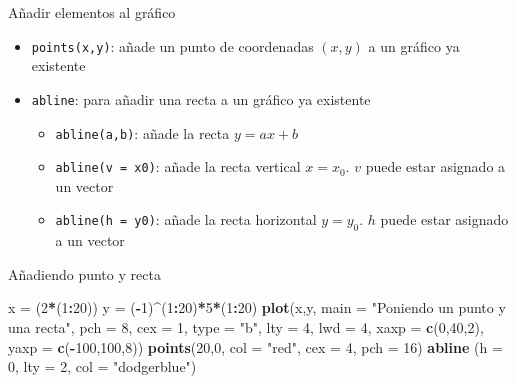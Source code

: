 \documentclass[
  ignorenonframetext,
]{beamer}
\newenvironment{Shaded}{\begin{snugshade}}{\end{snugshade}}
\newcommand{\AttributeTok}[1]{\textcolor[rgb]{0.13,0.29,0.53}{#1}}
\newcommand{\DecValTok}[1]{\textcolor[rgb]{0.00,0.00,0.81}{#1}}
\newcommand{\FunctionTok}[1]{\textcolor[rgb]{0.13,0.29,0.53}{\textbf{#1}}}
\newcommand{\NormalTok}[1]{#1}
\newcommand{\OtherTok}[1]{\textcolor[rgb]{0.56,0.35,0.01}{#1}}
\newcommand{\SpecialCharTok}[1]{\textcolor[rgb]{0.81,0.36,0.00}{\textbf{#1}}}
\newcommand{\StringTok}[1]{\textcolor[rgb]{0.31,0.60,0.02}{#1}}
\providecommand{\tightlist}{%
  \setlength{\itemsep}{0pt}\setlength{\parskip}{0pt}}
\begin{document}
\begin{frame}[fragile]{Añadir elementos al gráfico}
\label{auxf1adir-elementos-al-gruxe1fico}
\begin{itemize}
\tightlist
\item
  \texttt{points(x,y)}: añade un punto de coordenadas \((x, y)\) a un
  gráfico ya existente
\item
  \texttt{abline}: para añadir una recta a un gráfico ya existente

  \begin{itemize}
  \tightlist
  \item
    \texttt{abline(a,b)}: añade la recta \(y=ax+b\)
  \item
    \texttt{abline(v\ =\ x0)}: añade la recta vertical \(x=x_0\). \(v\)
    puede estar asignado a un vector
  \item
    \texttt{abline(h\ =\ y0)}: añade la recta horizontal \(y=y_0\).
    \(h\) puede estar asignado a un vector
  \end{itemize}
\end{itemize}
\end{frame}

\begin{frame}[fragile]{Añadiendo punto y recta}
\label{auxf1adiendo-punto-y-recta}
\begin{Shaded}
\begin{Highlighting}[]
\NormalTok{x }\OtherTok{=}\NormalTok{ (}\DecValTok{2}\SpecialCharTok{*}\NormalTok{(}\DecValTok{1}\SpecialCharTok{:}\DecValTok{20}\NormalTok{))}
\NormalTok{y }\OtherTok{=}\NormalTok{ (}\SpecialCharTok{{-}}\DecValTok{1}\NormalTok{)}\SpecialCharTok{\^{}}\NormalTok{(}\DecValTok{1}\SpecialCharTok{:}\DecValTok{20}\NormalTok{)}\SpecialCharTok{*}\DecValTok{5}\SpecialCharTok{*}\NormalTok{(}\DecValTok{1}\SpecialCharTok{:}\DecValTok{20}\NormalTok{)}
\FunctionTok{plot}\NormalTok{(x,y, }\AttributeTok{main =} \StringTok{"Poniendo un punto y una recta"}\NormalTok{, }\AttributeTok{pch =} \DecValTok{8}\NormalTok{,}
     \AttributeTok{cex =} \DecValTok{1}\NormalTok{, }\AttributeTok{type =} \StringTok{"b"}\NormalTok{, }\AttributeTok{lty =} \DecValTok{4}\NormalTok{, }
     \AttributeTok{lwd =} \DecValTok{4}\NormalTok{, }\AttributeTok{xaxp =} \FunctionTok{c}\NormalTok{(}\DecValTok{0}\NormalTok{,}\DecValTok{40}\NormalTok{,}\DecValTok{2}\NormalTok{), }\AttributeTok{yaxp =} \FunctionTok{c}\NormalTok{(}\SpecialCharTok{{-}}\DecValTok{100}\NormalTok{,}\DecValTok{100}\NormalTok{,}\DecValTok{8}\NormalTok{))}
\FunctionTok{points}\NormalTok{(}\DecValTok{20}\NormalTok{,}\DecValTok{0}\NormalTok{, }\AttributeTok{col =} \StringTok{"red"}\NormalTok{, }\AttributeTok{cex =} \DecValTok{4}\NormalTok{, }\AttributeTok{pch =} \DecValTok{16}\NormalTok{)}
\FunctionTok{abline}\NormalTok{ (}\AttributeTok{h =} \DecValTok{0}\NormalTok{, }\AttributeTok{lty =} \DecValTok{2}\NormalTok{, }\AttributeTok{col =} \StringTok{"dodgerblue"}\NormalTok{)}
\end{Highlighting}
\end{Shaded}
\end{frame}
\end{document}
